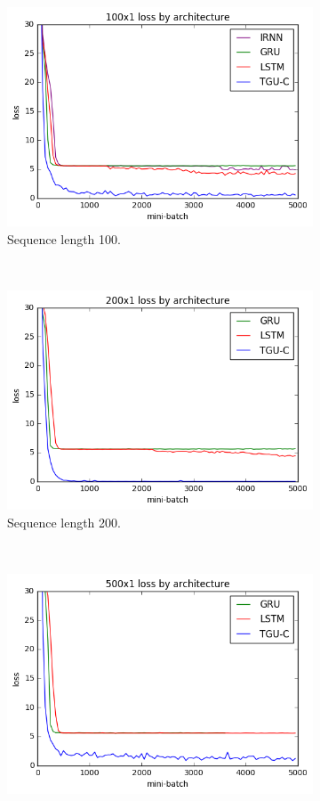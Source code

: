 \begin{figure}[p]
\begin{subfigure}[t]{0.3\linewidth}
	\includegraphics[width=\linewidth]{exps/vbind/plots/100x1}
	\caption{Sequence length 100.}
\end{subfigure}~
\begin{subfigure}[t]{0.3\linewidth}
	\includegraphics[width=\linewidth]{exps/vbind/plots/200x1}
	\caption{Sequence length 200.}
\end{subfigure}~
\begin{subfigure}[t]{0.3\linewidth}
	\includegraphics[width=\linewidth]{exps/vbind/plots/500x1}

\end{subfigure}
\end{figure}
